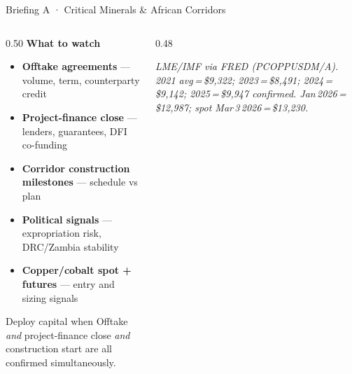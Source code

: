 \documentclass[aspectratio=169,10pt]{beamer}
\newcommand{\src}[1]{{\vspace{1pt}\par\raggedright\tiny\color{steel}\itshape #1}}
\newcommand{\er}{{\textcolor{navy}{\rule{16pt}{2.5pt}}}\enspace}
\begin{document}
\begin{frame}{Briefing A · Critical Minerals \& African Corridors}
\begin{columns}[T,totalwidth=\textwidth]

\begin{column}{0.50\textwidth}
{\scriptsize\bfseries\color{navy}What to watch}\\[4pt]
{\footnotesize\begin{itemize}\setlength\itemsep{3pt}
  \item \textbf{Offtake agreements} — volume, term, counterparty credit
  \item \textbf{Project-finance close} — lenders, guarantees, DFI co-funding
  \item \textbf{Corridor construction milestones} — schedule vs plan
  \item \textbf{Political signals} — expropriation risk, DRC/Zambia stability
  \item \textbf{Copper/cobalt spot + futures} — entry and sizing signals
\end{itemize}}
\vspace{6pt}
\begin{block}{\small Deploy capital when}
{\footnotesize Offtake \textit{and} project-finance close \textit{and} construction
start are all confirmed simultaneously.}
\end{block}
\end{column}

\begin{column}{0.48\textwidth}
\src{LME/IMF via FRED (PCOPPUSDM/A). 2021 avg\,=\,\$9{,}322; 2023\,=\,\$8{,}491; 2024\,=\,\$9{,}142; 2025\,=\,\$9{,}947 confirmed. Jan\,2026\,=\,\$12{,}987; spot Mar\,3\,2026\,=\,\$13{,}230.}
\end{column}


\end{columns}
\end{frame}
\end{document}
